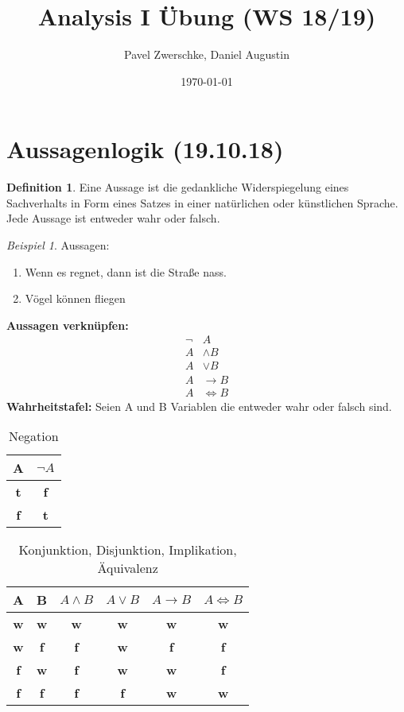 \documentclass[12pt,a4paper,titlepage]{article} %
\theoremstyle{definition}
\newtheorem{defi}[satz]{Definition}
\theoremstyle{remark}
\newtheorem*{bsp}{Beispiel}
\begin{document}
	\title{Analysis I Übung (WS 18/19)}
	\date{\today}
	\author{Pavel Zwerschke, Daniel Augustin}
	\maketitle
	
	\tableofcontents
	\newpage	
	\section{Aussagenlogik (19.10.18)}
	\begin{defi}
		Eine Aussage ist die gedankliche Widerspiegelung eines Sachverhalts in Form eines Satzes in einer natürlichen oder künstlichen Sprache.
		\vspace{5mm}\\
		Jede Aussage ist entweder wahr oder falsch.
	\end{defi}
	\begin{bsp}
		Aussagen:
		\begin{enumerate}
			\item Wenn es regnet, dann ist die Straße nass.
			\item Vögel können fliegen
		\end{enumerate}
	\end{bsp}
	\textbf{Aussagen verknüpfen:}
	\begin{align*}
		\neg &A\\
		A &\wedge B\\
		A &\vee B\\
		A &\rightarrow B\\
		A &\Leftrightarrow B
	\end{align*}
	\textbf{Wahrheitstafel:}
	Seien A und B Variablen die entweder wahr oder falsch sind.	
	\begin{table}[H]
		\centering
		\begin{tabular}{c | c}			
			A & \(\neg A\) \\ 
			\hline
			\textbf{t} & \textbf{f} \\
			\textbf{f} & \textbf{t}
		\end{tabular}
		\caption{Negation}
	\end{table}	
	\begin{table}[H]
		\centering
		\begin{tabular}{c | c | c | c | c | c}			
			A & B & \(A \wedge B\) & \(A \vee B\) & \(A \rightarrow B\) & \(A \Leftrightarrow B\) \\
			\hline
			\textbf{w} & \textbf{w} & \textbf{w} & \textbf{w} & \textbf{w} & \textbf{w} \\
			\textbf{w} & \textbf{f} & \textbf{f} & \textbf{w} & \textbf{f} & \textbf{f} \\
			\textbf{f} & \textbf{w} & \textbf{f} & \textbf{w} & \textbf{w} & \textbf{f} \\
			\textbf{f} & \textbf{f} & \textbf{f} & \textbf{f} & \textbf{w} & \textbf{w}
			
		\end{tabular}
		\caption{Konjunktion, Disjunktion, Implikation, Äquivalenz}
	\end{table}
\end{document}
